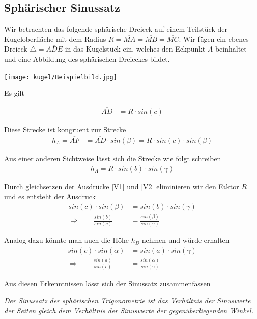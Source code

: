 \begin{refsection}
\subsection{Sphärischer Sinussatz}
Wir betrachten das folgende sphärische Dreieck auf einem Teilstück der Kugeloberfläche mit dem Radius $R= \overline{MA} = \overline{MB} = \overline{MC}$. Wir fügen ein ebenes Dreieck $\triangle=\overline{ADE}$ in das Kugelstück ein, welches den Eckpunkt $A$ beinhaltet und eine Abbildung des sphärischen Dreieckes bildet.

\begin{center}
        \texttt{[image: kugel/Beispielbild.jpg]}
\end{center}

Es gilt

\begin{align*}
\overline{AD} &= R \cdot sin (c)
\end{align*}

Diese Strecke ist kongruent zur Strecke
\begin{align}
h_{A} = \overline{AF} &= \overline{AD} \cdot sin(\beta) = R \cdot sin(c) \cdot sin(\beta)  
\label {V1}
\end{align}

Aus einer anderen Sichtweise lässt sich die Strecke wie folgt schreiben
\begin{align}
h_{A} = R \cdot sin(b) \cdot sin(\gamma)  
\label {V2}
\end{align}

Durch gleichsetzen der Ausdrücke \eqref{V1} und \eqref{V2} eliminieren wir den Faktor $R$ und es entsteht der Ausdruck
\begin{align*}
sin(c) \cdot sin(\beta) &= sin(b) \cdot sin(\gamma) \\
\Rightarrow \quad \quad
\frac{sin (b)}{sin (c)} &= \frac{sin (\beta)}{sin (\gamma)}
\end{align*}

Analog dazu könnte man auch die Höhe $h_{B}$ nehmen und würde erhalten
\begin{align*}
sin(c) \cdot sin(\alpha) &= sin(a) \cdot sin(\gamma) \\
\Rightarrow \quad \quad
\frac{sin (a)}{sin (c)} &= \frac{sin (\alpha)}{sin (\gamma)}
\end{align*}

Aus diesen Erkenntnissen lässt sich der Sinussatz zusammenfassen
\begin{satz}\textit{Der Sinussatz der sphärischen Trigonometrie ist das Verhältnis der Sinuswerte der Seiten gleich dem Verhältnis der Sinuswerte der gegenüberliegenden Winkel.}
\label{skript:kugel:satz:Sinussatz}
\end{satz}


\end{refsection}

